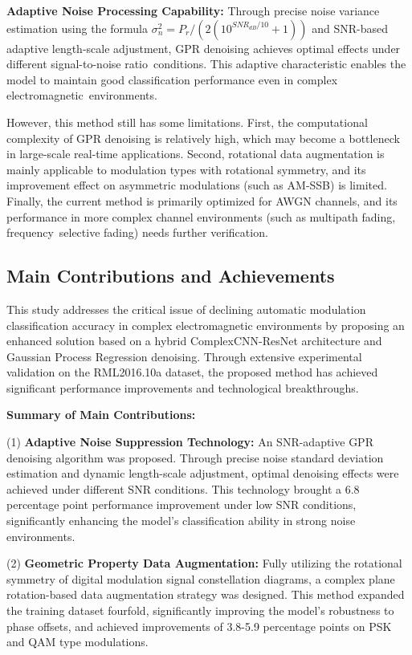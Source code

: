\documentclass[conference]{IEEEtran}
\begin{document}
\textbf{Adaptive Noise Processing Capability:} Through precise noise variance estimation using the formula $\sigma_n^2 = P_r/(2(10^{SNR_{dB}/10} + 1))$ and SNR-based adaptive length-scale adjustment, GPR denoising achieves optimal effects under different signal-to-noise ratio~conditions. This adaptive characteristic enables the model to maintain good classification performance even in complex electromagnetic~environments.

However, this method still has some limitations. First, the computational complexity of GPR denoising is relatively high, which may become a bottleneck in large-scale real-time applications. Second, rotational data augmentation is mainly applicable to modulation types with rotational symmetry, and its improvement effect on asymmetric modulations (such as AM-SSB) is limited. Finally, the current method is primarily optimized for AWGN channels, and its performance in more complex channel environments (such as multipath fading, frequency~selective fading) needs further verification.

\subsection{Main Contributions and Achievements}

This study addresses the critical issue of declining automatic modulation classification accuracy in complex electromagnetic environments by proposing an enhanced solution based on a hybrid ComplexCNN-ResNet architecture and Gaussian Process Regression denoising. Through extensive experimental validation on the RML2016.10a dataset, the proposed method has achieved significant performance improvements and technological breakthroughs.

\textbf{Summary of Main Contributions:}

(1) \textbf{Adaptive Noise Suppression Technology:} An SNR-adaptive GPR denoising algorithm was proposed. Through precise noise standard deviation estimation and dynamic length-scale adjustment, optimal denoising effects were achieved under different SNR conditions. This technology brought a 6.8 percentage point performance improvement under low SNR conditions, significantly enhancing the model's classification ability in strong noise environments.

(2) \textbf{Geometric Property Data Augmentation:} Fully utilizing the rotational symmetry of digital modulation signal constellation diagrams, a complex plane rotation-based data augmentation strategy was designed. This method expanded the training dataset fourfold, significantly improving the model's robustness to phase offsets, and achieved improvements of 3.8-5.9 percentage points on PSK and QAM type modulations.
\end{document}
